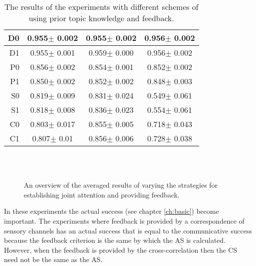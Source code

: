 \begin{table}
\begin{tabular}{||r|c|c|c||}
D0      	&	       0.955$\pm$   0.002	&	       0.955$\pm$   0.002	&	       0.956$\pm$   0.002	\\\hline
D1      	&	       0.955$\pm$   0.001	&	       0.959$\pm$  0.000	&	       0.956$\pm$   0.002	\\\hline
P0      	&	       0.856$\pm$   0.002	&	       0.854$\pm$   0.001	&	       0.852$\pm$   0.002	\\\hline
P1      	&	       0.850$\pm$   0.002	&	       0.852$\pm$   0.002	&	       0.848$\pm$   0.003	\\\hline
S0      	&	       0.819$\pm$   0.009	&	       0.831$\pm$   0.024	&	       0.549$\pm$   0.061	\\\hline
S1      	&	       0.818$\pm$   0.008	&	       0.836$\pm$   0.023	&	       0.554$\pm$   0.061	\\\hline
C0      	&	       0.803$\pm$   0.017	&	       0.855$\pm$   0.005	&	       0.718$\pm$   0.043	\\\hline
C1      	&	       0.807$\pm$    0.01	&	       0.856$\pm$   0.006	&	       0.728$\pm$   0.038	\\\hline
\hline
\end{tabular}
\caption{The results of the experiments with different schemes of using prior topic knowledge and feedback.}
\label{t:feed:combination}
\end{table}

\begin{figure}
\\
\\
\end{figure}
\begin{figure}
\centering
{}
\caption{An overview of the averaged results of varying the strategies for establishing joint attention and providing feedback.}
\label{f:feed:comb}
\end{figure}

In these experiments the actual success (see chapter \ref{ch:basic}) become important. The experiments where feedback is provided by a correspondence of sensory channels has an actual success that is equal to the communicative success because the feedback criterion is the same by which the AS is calculated. However, when the feedback is provided by the cross-correlation then the CS need not be the same as the AS.

